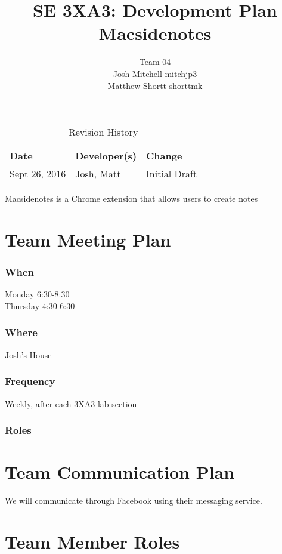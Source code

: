 \documentclass{article}
\title{SE 3XA3: Development Plan\\Macsidenotes}
\author{Team 04
	\\ Josh Mitchell mitchjp3
	\\ Matthew Shortt shorttmk
}
\date{}
\begin{document}
	
	\begin{table}[hp]
		\caption{Revision History} \label{TblRevisionHistory}
		\begin{tabularx}{\textwidth}{llX}
			\toprule
			\textbf{Date} & \textbf{Developer(s)} & \textbf{Change}\\
			\midrule
			Sept 26, 2016 & Josh, Matt & Initial Draft\\
			\bottomrule
		\end{tabularx}
	\end{table}
	
	\newpage
	
	\maketitle
	
	Macsidenotes is a Chrome extension that allows users to create notes
	
	\section{Team Meeting Plan}
	\subsubsection*{When}
	Monday 6:30-8:30 \\
	Thursday 4:30-6:30
	\subsubsection*{Where}
	Josh's House
	\subsubsection*{Frequency}
	Weekly, after each 3XA3 lab section
	\subsubsection*{Roles}
	
	
	\section{Team Communication Plan}
	
	We will communicate through Facebook using their messaging service. 
	
	\section{Team Member Roles}
	
\end{document}
